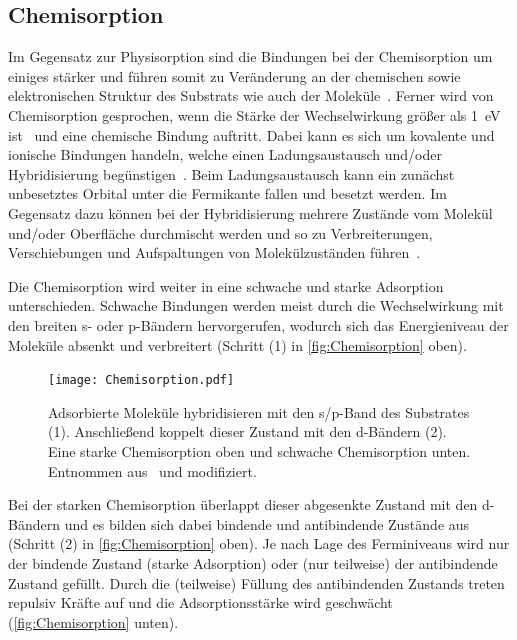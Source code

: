         \subsection{Chemisorption}
            Im Gegensatz zur Physisorption sind die Bindungen bei der Chemisorption um einiges stärker und führen somit zu Veränderung an der chemischen sowie elektronischen Struktur des Substrats wie auch der Moleküle~\cite{bergenti_spinterface_2019}.
            Ferner wird von Chemisorption gesprochen, wenn die Stärke der Wechselwirkung größer als \SI{1}{\electronvolt} ist~\cite{muscat_chemisorption_1978} und eine chemische Bindung auftritt.
            Dabei kann es sich um kovalente und ionische Bindungen handeln, welche einen Ladungsaustausch und/oder Hybridisierung begünstigen~\cite{harutyunyan_hybridisation_2013}.
            Beim Ladungsaustausch kann ein zunächst unbesetztes Orbital unter die Fermikante fallen und besetzt werden.
            Im Gegensatz dazu können bei der Hybridisierung mehrere Zustände vom Molekül und/oder Oberfläche durchmischt werden und so zu Verbreiterungen, Verschiebungen und Aufspaltungen von Molekülzuständen führen~\cite{IF_1}.
            
            Die Chemisorption wird weiter in eine schwache und starke Adsorption unterschieden.
            Schwache Bindungen werden meist durch die Wechselwirkung mit den breiten s- oder p-Bändern hervorgerufen, wodurch sich das Energieniveau der Moleküle absenkt und verbreitert (Schritt (1) in \autoref{fig:Chemisorption} oben).
            \begin{figure}
                \centering
                \texttt{[image: Chemisorption.pdf]}
                \caption{Adsorbierte Moleküle hybridisieren mit den s/p-Band des Substrates (1).
                Anschließend koppelt dieser Zustand mit den d-Bändern (2).
                Eine starke Chemisorption oben und schwache Chemisorption unten.
                Entnommen aus~\cite{IF_1} und modifiziert.}
                \label{fig:Chemisorption}
            \end{figure}
            Bei der starken Chemisorption überlappt dieser abgesenkte Zustand mit den d-Bändern und es bilden sich dabei bindende und antibindende Zustände aus (Schritt (2) in \autoref{fig:Chemisorption} oben).
            Je nach Lage des Ferminiveaus wird nur der bindende Zustand (starke Adsorption) oder (nur teilweise) der antibindende Zustand gefüllt.
            Durch die (teilweise) Füllung des antibindenden Zustands treten repulsiv Kräfte auf und die Adsorptionsstärke wird geschwächt (\autoref{fig:Chemisorption} unten).

